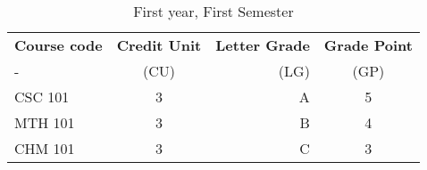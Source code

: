 \documentclass{article}
\begin{document}
	\begin{table}
		\caption{First year, First Semester}
		\label{tab:table1}
		\begin{tabular}{l|c|r|c}
				\textbf{Course code}&\textbf{Credit Unit}&\textbf{Letter Grade}&\textbf{Grade Point}\\
			-&(CU)&(LG)& (GP)\\
			\hline
			CSC 101 &3&A&5\\
			MTH 101 &3&B&4\\
			CHM 101 &3&C&3\\
			
		\end{tabular}
	\end{table}
\end{document}
